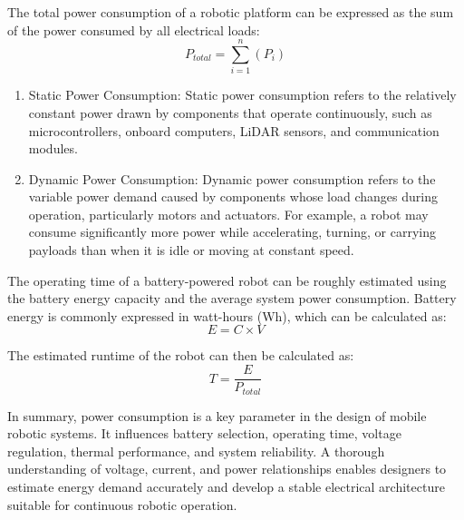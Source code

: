 

The total power consumption of a robotic platform can be expressed as the sum of the power consumed by all electrical loads:
\begin{equation}
    P_{total} = \sum_{i=1}^{n} (P_i)
\end{equation}

\begin{enumerate}
    \item Static Power Consumption: Static power consumption refers to the relatively constant power drawn by components that operate continuously, such as microcontrollers, onboard computers, LiDAR sensors, and communication modules.
    \item Dynamic Power Consumption: Dynamic power consumption refers to the variable power demand caused by components whose load changes during operation, particularly motors and actuators. For example, a robot may consume significantly more power while accelerating, turning, or carrying payloads than when it is idle or moving at constant speed.
\end{enumerate}

The operating time of a battery-powered robot can be roughly estimated using the battery energy capacity and the average system power consumption. Battery energy is commonly expressed in watt-hours (Wh), which can be calculated as:
\begin{equation}
    E = C \times V
\end{equation}




The estimated runtime of the robot can then be calculated as:
\begin{equation}
    T = \frac{E}{P_{total}}
\end{equation}

In summary, power consumption is a key parameter in the design of mobile robotic systems. It influences battery selection, operating time, voltage regulation, thermal performance, and system reliability. A thorough understanding of voltage, current, and power relationships enables designers to estimate energy demand accurately and develop a stable electrical architecture suitable for continuous robotic operation.

